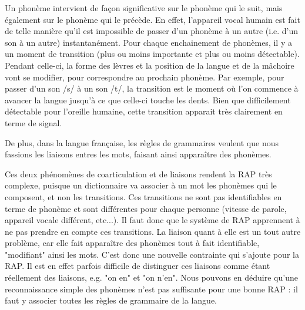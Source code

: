 	Un phonème intervient de façon significative sur le phonème qui le suit, mais également sur le phonème qui le précède. En effet, l'appareil vocal humain est fait de telle manière qu'il est impossible de passer d'un phonème à un autre (i.e. d'un son à un autre) instantanément. Pour chaque enchainement de phonèmes, il y a un moment de transition (plus ou moins importante et plus ou moins détectable). Pendant celle-ci, la forme des lèvres et la position de la langue et de la mâchoire vont se modifier, pour correspondre au prochain phonème. Par exemple, pour passer d'un son /s/ à un son /t/, la transition est le moment où l'on commence à avancer la langue jusqu'à ce que celle-ci touche les dents. Bien que difficilement détectable pour l'oreille humaine, cette transition apparait très clairement en terme de signal.
	
	De plus, dans la langue française, les règles de grammaires veulent que nous fassions les liaisons entres les mots, faisant ainsi apparaître des phonèmes.
	
	Ces deux phénomènes de coarticulation et de liaisons rendent la RAP très complexe, puisque un dictionnaire va associer à un mot les phonèmes qui le composent, et non les transitions. Ces transitions ne sont pas identifiables en terme de phonème et sont différentes pour chaque personne (vitesse de parole, appareil vocale différent, etc...). Il faut donc que le système de RAP apprennent à ne pas prendre en compte ces transitions. La liaison quant à elle est un tout autre problème, car elle fait apparaître des phonèmes tout à fait identifiable, "modifiant" ainsi les mots. C'est donc une nouvelle contrainte qui s'ajoute pour la RAP. Il est en effet parfois difficile de distinguer ces liaisons comme étant réellement des liaisons, e.g. "on en" et "on n'en". Nous pouvons en déduire qu'une reconnaissance simple des phonèmes n'est pas suffisante pour une bonne RAP : il faut y associer toutes les règles de grammaire de la langue.
	
	
